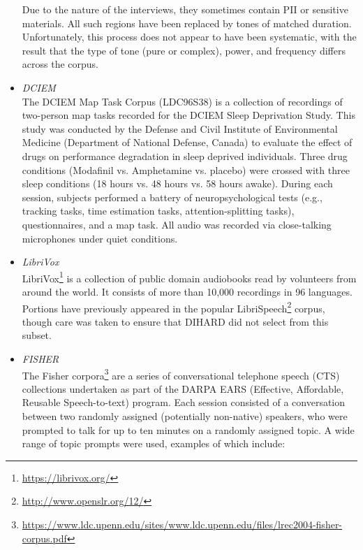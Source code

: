\documentclass{article}
\begin{document}
\begin{appendices}
\begin{itemize}
            Due to the nature of the interviews, they sometimes contain PII or sensitive materials. All such regions have been replaced by tones of matched duration. Unfortunately, this process does not appear to have been systematic, with the result that the type of tone (pure or complex), power, and frequency differs across the corpus.
        \item {\it DCIEM} \\
            The DCIEM Map Task Corpus (LDC96S38) is a collection of recordings of two-person map tasks recorded for the DCIEM Sleep Deprivation Study. This study was conducted by the Defense and Civil Institute of Environmental  Medicine  (Department  of National  Defense,  Canada) to evaluate the effect of drugs on performance degradation in sleep deprived individuals. Three drug conditions (Modafinil vs. Amphetamine vs. placebo) were crossed with three sleep conditions (18 hours vs. 48 hours vs. 58 hours awake). During each session, subjects performed a battery of neuropsychological tests (e.g., tracking tasks, time estimation tasks, attention-splitting tasks), questionnaires, and a map task. All audio was recorded via close-talking microphones under quiet conditions.
        \item {\it LibriVox} \\
            LibriVox\footnote{\url{https://librivox.org/}} is a collection of public domain audiobooks read by volunteers from around the world. It consists of more than 10,000 recordings in 96 languages. Portions have previously appeared in the popular LibriSpeech\footnote{\url{http://www.openslr.org/12/}} corpus, though care was taken to ensure that DIHARD did not select from this subset.
        \item {\it FISHER} \\
            The Fisher corpora\footnote{\url{https://www.ldc.upenn.edu/sites/www.ldc.upenn.edu/files/lrec2004-fisher-corpus.pdf}} are a series of conversational telephone speech (CTS) collections undertaken as part of the DARPA EARS (Effective, Affordable, Reusable Speech-to-text) program. Each session consisted of a conversation between two randomly assigned (potentially non-native) speakers, who were prompted to talk for up to ten minutes on a randomly assigned topic. A wide range of topic prompts were used, examples of which include:

\end{itemize}
\end{appendices}
\end{document}
